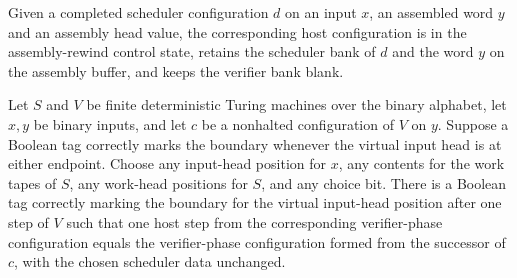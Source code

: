 \begin{definition}
\label{Complexity.b2ReadyCfg}
\leanok
{}
Given a completed scheduler configuration $d$ on an input $x$, an assembled word $y$ and an assembly head value, the corresponding host configuration is in the assembly-rewind control state, retains the scheduler bank of $d$ and the word $y$ on the assembly buffer, and keeps the verifier bank blank.
\end{definition}

\begin{lemma}
\label{Complexity.b2_verify_step}
\leanok
{}
Let $S$ and $V$ be finite deterministic Turing machines over the binary alphabet, let
$x,y$ be binary inputs, and let $c$ be a nonhalted configuration of $V$ on $y$. Suppose
a Boolean tag correctly marks the boundary whenever the virtual input head is at either
endpoint. Choose any input-head position for $x$, any contents for the work tapes of
$S$, any work-head positions for $S$, and any choice bit. There is a Boolean tag
correctly marking the boundary for the virtual input-head position after one step of $V$
such that one host step from the corresponding verifier-phase configuration equals the
verifier-phase configuration formed from the successor of $c$, with the chosen scheduler
data unchanged.
\end{lemma}

